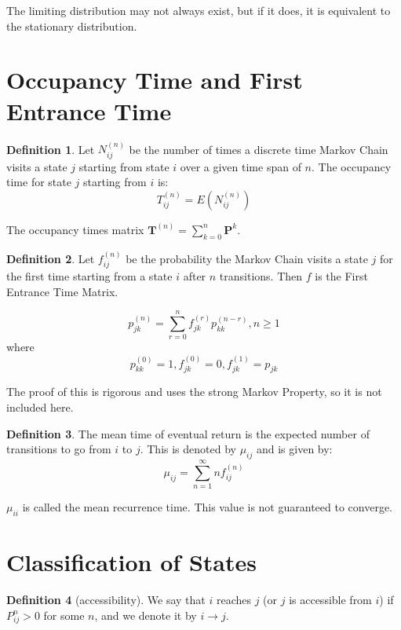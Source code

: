 \documentclass[12pt,letterpaper]{amsbook}
\theoremstyle{definition}
\newtheorem{definition}{Definition}%
\begin{document}
The limiting distribution may not always exist, but if it does, it is equivalent to the stationary distribution.

\section{Occupancy Time and First Entrance Time}

\begin{definition}
  Let $N_{ij}^{(n)}$ be the number of times a discrete time Markov Chain visits a state $j$ starting from state $i$ over a given time span of $n$. The occupancy time for state $j$ starting from $i$ is:
  \[T_{ij}^{(n)} = E(N_{ij}^{(n)})\]
\end{definition}

\begin{theorem}
  The occupancy times matrix $\mathbf{T}^{(n)} = \sum_{k=0}^{n} \mathbf{P}^{k}$.  
\end{theorem}

\begin{definition}
  Let $f_{ij}^{(n)}$ be the probability the Markov Chain visits a state $j$ for the first time starting from a state $i$ after $n$ transitions. Then $f$ is the First Entrance Time Matrix.
\end{definition}

\begin{theorem}
  \[p_{jk}^{(n)} = \sum_{r=0}^n f_{jk}^{(r)}p_{kk}^{(n-r)}, n \geq 1\]
  where
  \[p_{kk}^{(0)} = 1, f_{jk}^{(0)} = 0, f_{jk}^{(1)} = p_{jk}\]
\end{theorem}

The proof of this is rigorous and uses the strong Markov Property, so it is not included here.

\begin{definition}
The mean time of eventual return is the expected number of transitions to go from $i$ to $j$. This is denoted by $\mu_{ij}$ and is given by:
\[\mu_{ij} = \sum_{n=1}^{\infty} n f_{ij}^{(n)}\]
\end{definition}

$\mu_{ii}$ is called the mean recurrence time. This value is not guaranteed to converge.

\section{Classification of States}

\begin{definition}[accessibility]
  We say that $i$ reaches $j$ (or $j$ is accessible from $i$) if $P^{n}_{ij} > 0$ for some $n$, and we denote it by $i \rightarrow j$.
\end{definition}
\end{document}
